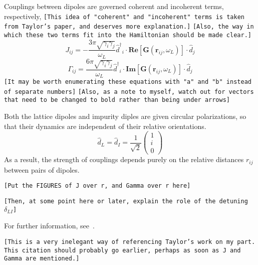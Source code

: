 \documentclass[aps,pra,superscriptaddress,twocolumn]{revtex4-1}
\newcommand{\commentSB}[1]{\texttt{\color{blue}[#1]}}
\begin{document}
    Couplings between dipoles are governed coherent and incoherent terms, respectively, 
    \commentSB{This idea of "coherent" and "incoherent" terms is taken from Taylor's paper, and deserves more explanation.}
    \commentSB{Also, the way in which these two terms fit into the Hamiltonian should be made clear.}
    \begin{equation} 
        J_{ij} = -\frac{3\pi \sqrt{\gamma_i \gamma_j}}{\omega_L} {\hat{d}^\dagger}_i \cdot \textbf{Re} [\textbf{G}(\textbf{r}_{ij}, \omega_L)] \cdot \hat{d}_j 
        \label{eqn:J}
    \end{equation}
    \begin{equation}
        \Gamma_{ij} = \frac{6\pi \sqrt{\gamma_i \gamma_j}}{\omega_L} {\hat{d}^\dagger}_i \cdot \textbf{Im} [\textbf{G}(\textbf{r}_{ij},\omega_L)] \cdot \hat{d}_j 
        \label{eqn:Gamma}
    \end{equation}
    \commentSB{It may be worth enumerating these equations with "a" and "b" instead of separate numbers}
    \commentSB{Also, as a note to myself, watch out for vectors that need to be changed to bold rather than being under arrows}

    Both the lattice dipoles and impurity diples are given circular polarizations, so that their dynamics are independent of their relative orientations.
    \begin{equation} 
        \hat{d}_L = \hat{d}_I = \frac{1}{\sqrt{2}} \begin{pmatrix}
        1 \\ i \\ 0
        \end{pmatrix} 
        \label{eqn:polarization}
    \end{equation}
    As a result, the strength of couplings depends purely on the relative distances $r_{ij}$ between pairs of dipoles. 

    \commentSB{Put the FIGURES of J over r, and Gamma over r here}

    \commentSB{Then, at some point here or later, explain the role of the detuning $\delta_{LI}$}

    For further information, see~\cite{patti_controlling_2021}.

    \commentSB{This is a very inelegant way of referencing Taylor's work on my part. This citation should probably go earlier, perhaps as soon as J and Gamma are mentioned.}
\end{document}
